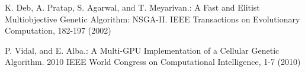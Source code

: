 \begin{thebibliography}{}
K. Deb, A. Pratap, S. Agarwal, and T. Meyarivan.:
A Fast and Elitist Multiobjective Genetic Algorithm: NSGA-II.
IEEE Transactions on Evolutionary Computation, 182-197 (2002)

P. Vidal, and E. Alba.:
A Multi-GPU Implementation of a Cellular Genetic Algorithm.
2010 IEEE World Congress on Computational Intelligence, 1-7 (2010)










\end{thebibliography}
\clearpage

